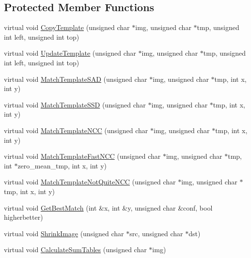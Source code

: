 \subsection*{Protected Member Functions}
\begin{DoxyCompactItemize}
\item 
virtual void \hyperlink{classsvl_tracker_m_s_brute_force_a568ffd62a1cdb2dee5d9b01b18a3239c}{Copy\+Template} (unsigned char $\ast$img, unsigned char $\ast$tmp, unsigned int left, unsigned int top)
\item 
virtual void \hyperlink{classsvl_tracker_m_s_brute_force_a4f7c44fcffa6dac28582e491bcd51721}{Update\+Template} (unsigned char $\ast$img, unsigned char $\ast$tmp, unsigned int left, unsigned int top)
\item 
virtual void \hyperlink{classsvl_tracker_m_s_brute_force_a5d11bf81ef35a192ab295a3f6cdfd35b}{Match\+Template\+S\+A\+D} (unsigned char $\ast$img, unsigned char $\ast$tmp, int x, int y)
\item 
virtual void \hyperlink{classsvl_tracker_m_s_brute_force_ac5ed82af34b9f4a85e8783440702fd99}{Match\+Template\+S\+S\+D} (unsigned char $\ast$img, unsigned char $\ast$tmp, int x, int y)
\item 
virtual void \hyperlink{classsvl_tracker_m_s_brute_force_a3c20efe2410727b7f801ed6d65ad5564}{Match\+Template\+N\+C\+C} (unsigned char $\ast$img, unsigned char $\ast$tmp, int x, int y)
\item 
virtual void \hyperlink{classsvl_tracker_m_s_brute_force_afa3edfa4b1064d29cfc53e06647daef1}{Match\+Template\+Fast\+N\+C\+C} (unsigned char $\ast$img, unsigned char $\ast$tmp, int $\ast$zero\+\_\+mean\+\_\+tmp, int x, int y)
\item 
virtual void \hyperlink{classsvl_tracker_m_s_brute_force_aafd758fa73baf5bd711d0e7b64c2826d}{Match\+Template\+Not\+Quite\+N\+C\+C} (unsigned char $\ast$img, unsigned char $\ast$tmp, int x, int y)
\item 
virtual void \hyperlink{classsvl_tracker_m_s_brute_force_a0439000516a913671b157791aa66986f}{Get\+Best\+Match} (int \&x, int \&y, unsigned char \&conf, bool higherbetter)
\item 
virtual void \hyperlink{classsvl_tracker_m_s_brute_force_a545b573c0cb4dde41496e276427be31d}{Shrink\+Image} (unsigned char $\ast$src, unsigned char $\ast$dst)
\item 
virtual void \hyperlink{classsvl_tracker_m_s_brute_force_afb011bf86f256029c09d947a9d05c930}{Calculate\+Sum\+Tables} (unsigned char $\ast$img)
\end{DoxyCompactItemize}
